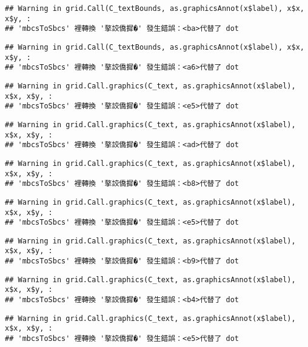\documentclass[
]{article}
\begin{document}
\begin{verbatim}
## Warning in grid.Call(C_textBounds, as.graphicsAnnot(x$label), x$x, x$y, :
## 'mbcsToSbcs' 裡轉換 '摮詨僑摨�' 發生錯誤：<ba>代替了 dot
\end{verbatim}

\begin{verbatim}
## Warning in grid.Call(C_textBounds, as.graphicsAnnot(x$label), x$x, x$y, :
## 'mbcsToSbcs' 裡轉換 '摮詨僑摨�' 發生錯誤：<a6>代替了 dot
\end{verbatim}

\begin{verbatim}
## Warning in grid.Call.graphics(C_text, as.graphicsAnnot(x$label), x$x, x$y, :
## 'mbcsToSbcs' 裡轉換 '摮詨僑摨�' 發生錯誤：<e5>代替了 dot
\end{verbatim}

\begin{verbatim}
## Warning in grid.Call.graphics(C_text, as.graphicsAnnot(x$label), x$x, x$y, :
## 'mbcsToSbcs' 裡轉換 '摮詨僑摨�' 發生錯誤：<ad>代替了 dot
\end{verbatim}

\begin{verbatim}
## Warning in grid.Call.graphics(C_text, as.graphicsAnnot(x$label), x$x, x$y, :
## 'mbcsToSbcs' 裡轉換 '摮詨僑摨�' 發生錯誤：<b8>代替了 dot
\end{verbatim}

\begin{verbatim}
## Warning in grid.Call.graphics(C_text, as.graphicsAnnot(x$label), x$x, x$y, :
## 'mbcsToSbcs' 裡轉換 '摮詨僑摨�' 發生錯誤：<e5>代替了 dot
\end{verbatim}

\begin{verbatim}
## Warning in grid.Call.graphics(C_text, as.graphicsAnnot(x$label), x$x, x$y, :
## 'mbcsToSbcs' 裡轉換 '摮詨僑摨�' 發生錯誤：<b9>代替了 dot
\end{verbatim}

\begin{verbatim}
## Warning in grid.Call.graphics(C_text, as.graphicsAnnot(x$label), x$x, x$y, :
## 'mbcsToSbcs' 裡轉換 '摮詨僑摨�' 發生錯誤：<b4>代替了 dot
\end{verbatim}

\begin{verbatim}
## Warning in grid.Call.graphics(C_text, as.graphicsAnnot(x$label), x$x, x$y, :
## 'mbcsToSbcs' 裡轉換 '摮詨僑摨�' 發生錯誤：<e5>代替了 dot
\end{verbatim}
\end{document}
